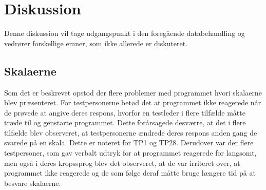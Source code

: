 \chapter{Diskussion}
\label{TestAfSkalaDiskussion}
%
Denne diskussion vil tage udgangspunkt i den foregående databehandling og vedrører forskellige emner, som ikke allerede er diskuteret.  

\section{Skalaerne}
\label{DiskussionSkala}
%
Som det er beskrevet  opstod der flere problemer med programmet hvori skalaerne blev præsenteret. For testpersonerne betød det at programmet ikke reagerede når de prøvede at angive deres respons, hvorfor en testleder i flere tilfælde måtte træde til og genstarte programmet. Dette forårsagede desværre, at det i flere tilfælde blev observeret, at testpersonerne ændrede deres respons anden gang de svarede på en skala. Dette er noteret for TP1 og TP28. Derudover var der flere testpersoner, som gav verbalt udtryk for at programmet reagerede for langsomt, men også i deres kropssprog blev det observeret, at de var irriteret over, at programmet ikke reagerede og de som følge deraf måtte bruge længere tid på at besvare skalaerne. 

